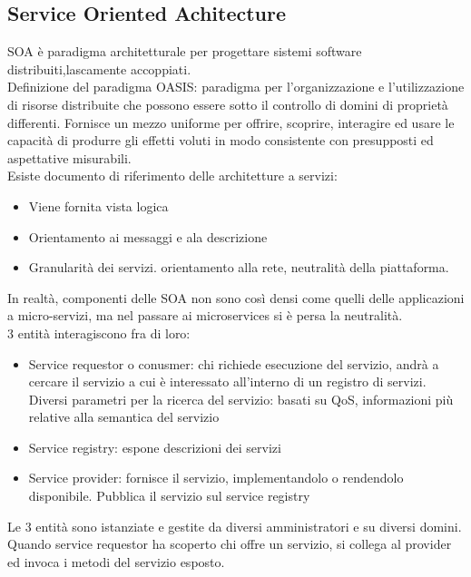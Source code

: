 \documentclass[16px]{article}
\begin{document}
\subsection{Service Oriented Achitecture}
SOA è paradigma architetturale per progettare sistemi software distribuiti,lascamente accoppiati. \\ Definizione del paradigma OASIS: paradigma per l'organizzazione e l'utilizzazione di risorse distribuite che possono essere sotto il controllo di domini di proprietà differenti. Fornisce un mezzo uniforme per offrire, scoprire, interagire ed usare le capacità di produrre gli effetti voluti in modo consistente con presupposti ed aspettative misurabili.\\ Esiste documento di riferimento delle architetture a servizi:
\begin{itemize}
\item Viene fornita vista logica
\item Orientamento ai messaggi e ala descrizione
\item Granularità dei servizi. orientamento alla rete, neutralità della piattaforma.
\end{itemize}
In realtà, componenti delle SOA non sono così densi come quelli delle applicazioni a micro-servizi, ma nel passare ai microservices si è persa la neutralità.\\ 3 entità interagiscono fra di loro:
\begin{itemize}
\item Service requestor o conusmer: chi richiede esecuzione del servizio, andrà a cercare il servizio a cui è interessato all'interno di un registro di servizi. Diversi parametri per la ricerca del servizio: basati su QoS, informazioni più relative alla semantica del servizio
\item Service registry: espone descrizioni dei servizi
\item Service provider: fornisce il servizio, implementandolo o rendendolo disponibile. Pubblica il servizio sul service registry
\end{itemize}
Le 3 entità sono istanziate e gestite da diversi amministratori e su diversi domini. Quando service requestor ha scoperto chi offre un servizio, si collega al provider ed invoca i metodi del servizio esposto.
\end{document}
